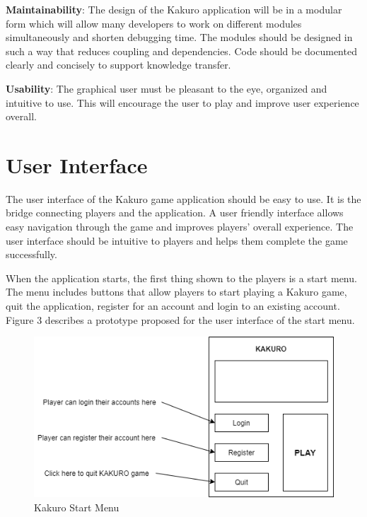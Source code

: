 \documentclass[12pt]{article}
\begin{document}
\textbf{Maintainability}: The design of the Kakuro application will be in a modular form which will allow many developers to work on different modules simultaneously and shorten debugging time. The modules should be designed in such a way that reduces coupling and dependencies. Code should be documented clearly and concisely to support knowledge transfer.

\vspace{5mm}

\textbf{Usability}: The graphical user must be pleasant to the eye, organized and intuitive to
use. This will encourage the user to play and improve user experience overall. 

\newpage


\section{User Interface}

The user interface of the Kakuro game application should be easy to use. It is the bridge connecting players and the application. A user friendly interface allows easy navigation through the game and improves players' overall experience. The user interface should be intuitive to players and helps them complete the game successfully.

When the application starts, the first thing shown to the players is a start menu. The menu includes buttons that allow players to start playing a Kakuro game, quit the application, register for an account and login to an existing account. Figure 3 describes a prototype proposed for the user interface of the start menu. 

\begin{figure}[htbp]
    \centering
    \includegraphics[scale=0.8]{UI-1.png}
    \caption{Kakuro Start Menu}
    \label{fig:UI-1}
\end{figure}
\end{document}
